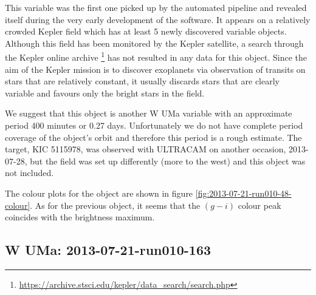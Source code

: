  
This variable was the first one picked up by the automated pipeline and revealed itself during the very early development of the software. It appears on a relatively crowded Kepler field which has at least 5 newly discovered variable objects. Although this field has been monitored by the Kepler satellite, a search through the Kepler online archive \footnote{\url{https://archive.stsci.edu/kepler/data_search/search.php}} has not resulted in any data for this object. Since the aim of the Kepler mission is to discover exoplanets via observation of transits on stars that are relatively constant, it usually discards stars that are clearly variable and favours only the bright stars in the field. 

We suggest that this object is another {W UMa} variable with an approximate period 400 minutes or 0.27 days. Unfortunately we do not have complete period coverage of the object's orbit and therefore this period is a rough estimate. The target, KIC 5115978, was observed with ULTRACAM on another occasion, 2013-07-28, but the field was set up differently (more to the west) and this object was not included. 

The colour plots for the object are shown in figure \ref{fig:2013-07-21-run010-48-colour}. As for the previous object, it seems that the $(g-i)$ colour peak coincides with the brightness maximum.

\subsection{{W UMa}: 2013-07-21-run010-163}

